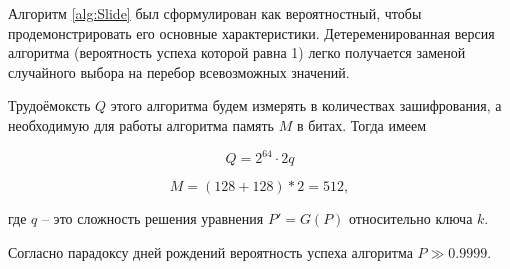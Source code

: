 \documentclass[a4paper,12pt]{article}
\begin{document}
	Алгоритм \ref{alg:Slide} был сформулирован как вероятностный, чтобы продемонстрировать его основные характеристики. Детеременированная версия алгоритма (вероятность успеха которой равна 1) легко получается заменой случайного выбора на перебор всевозможных значений.
	
	Трудоёмоксть $Q$ этого алгоритма будем измерять в количествах зашифрования, а необходимую для работы алгоритма память $M$ в битах. Тогда имеем
	
	\[ Q = 2^{64} \cdot 2q\]
	
	\[ M = (128+128)*2 = 512, \]
	
	где $q$ -- это сложность решения уравнения $P'=G(P)$ относительно ключа $k$. 
	
	Согласно парадоксу дней рождений вероятность успеха алгоритма $P \gg 0.9999$.
	
	
	
\end{document}
